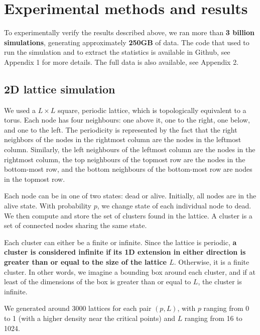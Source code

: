 \chapter{Experimental methods and results} 




To experimentally verify the results described above, we ran more than \textbf{3 billion simulations}, generating approximately \textbf{250GB} of data. The code that used to run the simulation and to extract the statistics is available in Github, see Appendix 1 for more details. The full data is also available, see Appendix 2. 


\section{2D lattice simulation}
\label{sec:2d_lattice_simulation}


We used a $L \times L$ square, periodic lattice, which is topologically equivalent to a torus. Each node has four neighbours: one above it, one to the right, one below, and one to the left. The periodicity is represented by the fact that the right neighbors of the nodes in the rightmost column are the nodes in the leftmost column. Similarly, the left neighbours of the leftmost column are the nodes in the rightmost column, the top neighbours of the topmost row are the nodes in the bottom-most row, and the bottom neighbours of the bottom-most row are nodes in the topmost row.

Each node can be in one of two states: dead or alive. Initially, all nodes are in the alive state. With probability $p$, we change state of each individual node to dead. We then compute and store the set of clusters found in the lattice. A cluster is a set of connected nodes sharing the same state. 

Each cluster can either be a finite or infinite. Since the lattice is periodic, \textbf{a cluster is considered infinite if its 1D extension in either direction is greater than or equal to the size of the lattice $L$}. Otherwise, it is a finite cluster. In other words, we imagine a bounding box around each cluster, and if at least of the dimensions of the box is greater than or equal to $L$, the cluster is infinite. 

We generated around 3000 lattices for each pair $(p, L)$, with $p$ ranging from 0 to 1 (with a higher density near the critical points) and $L$ ranging from 16 to 1024.


